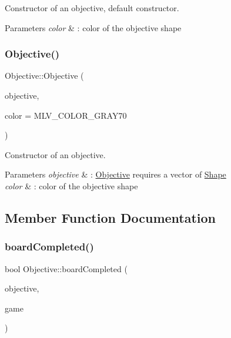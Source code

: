 Constructor of an objective, default constructor. 


\begin{DoxyParams}{Parameters}
{\em color} & \+: color of the objective shape \\
\hline
\end{DoxyParams}
\mbox{\label{classObjective_a7b72b9e9f9174ec9ee98e3a0a28773f2}} 
\subsubsection{\texorpdfstring{Objective()}{Objective()}\hspace{0.1cm}{\footnotesize\ttfamily [2/2]}}
{\footnotesize\ttfamily Objective\+::\+Objective (\begin{DoxyParamCaption}\item[{const std\+::vector$<$ std\+::shared\+\_\+ptr$<$ \hyperlink{classShape}{Shape} $>$$>$ \&}]{objective,  }\item[{M\+L\+V\+\_\+\+Color}]{color = {\ttfamily MLV\+\_\+COLOR\+\_\+GRAY70} }\end{DoxyParamCaption})\hspace{0.3cm}{\ttfamily [explicit]}}



Constructor of an objective. 


\begin{DoxyParams}{Parameters}
{\em objective} & \+: \hyperlink{classObjective}{Objective} requires a vector of \hyperlink{classShape}{Shape} \\
\hline
{\em color} & \+: color of the objective shape \\
\hline
\end{DoxyParams}


\subsection{Member Function Documentation}
\mbox{\label{classObjective_aba5fe938ebccb3825d6b03cd789d6d61}} 
\subsubsection{\texorpdfstring{board\+Completed()}{boardCompleted()}}
{\footnotesize\ttfamily bool Objective\+::board\+Completed (\begin{DoxyParamCaption}\item[{const std\+::vector$<$ std\+::shared\+\_\+ptr$<$ \hyperlink{classShape}{Shape} $>$$>$ \&}]{objective,  }\item[{const std\+::vector$<$ std\+::shared\+\_\+ptr$<$ \hyperlink{classShape}{Shape} $>$$>$ \&}]{game }\end{DoxyParamCaption})\hspace{0.3cm}{\ttfamily [static]}}



